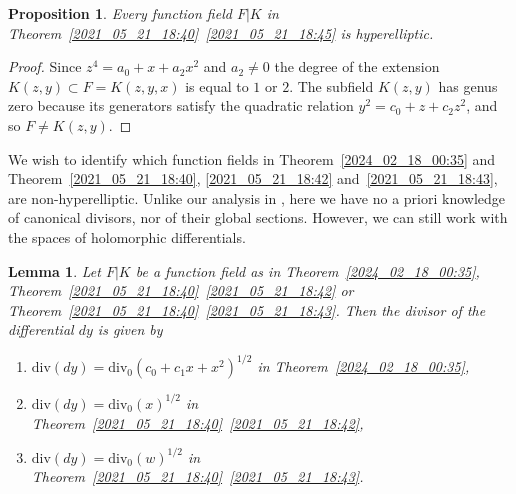 \documentclass[12pt,reqno]{amsart}
\newtheorem{prop}[thm]{Proposition}
\newtheorem{lem}[thm]{Lemma}
\theoremstyle{definition}
\newcommand{\su}{\subset}
\begin{document}
\begin{prop}
Every function field $F|K$ in Theorem~\ref{2021_05_21_18:40}~\ref{2021_05_21_18:45} is hyperelliptic.
\end{prop}

\begin{proof}
Since $z^4 = a_0 + x + a_2 x^2$ and $a_2 \neq 0$ the degree of the extension $K(z,y) \su F=K(z,y,x)$ is equal to $1$ or $2$. 
The subfield $K(z,y)$ has genus zero because its generators satisfy the quadratic relation $y^2 = c_0 + z + c_2 z^2$, and so $F \neq K(z,y)$.
\end{proof}

We wish to identify which function fields in Theorem~\ref{2024_02_18_00:35} and Theorem~\ref{2021_05_21_18:40}, \ref{2021_05_21_18:42} and~\ref{2021_05_21_18:43}, are non-hyperelliptic.
Unlike our analysis in \cite[Section~4]{HiSt23}, here we have no a priori knowledge of canonical divisors, nor of their global sections. 
However, we can still work with the spaces of holomorphic differentials.

\begin{lem}\label{2024_10_16_15:05}
Let $F|K$ be a function field as in Theorem~\ref{2024_02_18_00:35}, Theorem~\ref{2021_05_21_18:40}~\ref{2021_05_21_18:42} or Theorem~\ref{2021_05_21_18:40}~\ref{2021_05_21_18:43}.
Then the divisor of the differential $dy$ is given by
\begin{enumerate}[\upshape (a)]
    \item $\mathrm{div}(dy) = \mathrm{div}_0 (c_0 + c_1 x + x^2 )^{1/2}$ in Theorem~\ref{2024_02_18_00:35},
    \item $\mathrm{div}(dy) = \mathrm{div}_0(x)^{1/2}$ in Theorem~\ref{2021_05_21_18:40}~\ref{2021_05_21_18:42}, 
    \item $\mathrm{div}(dy) = \mathrm{div}_0(w)^{1/2}$ in Theorem~\ref{2021_05_21_18:40}~\ref{2021_05_21_18:43}.
\end{enumerate}
\end{lem}
\end{document}
